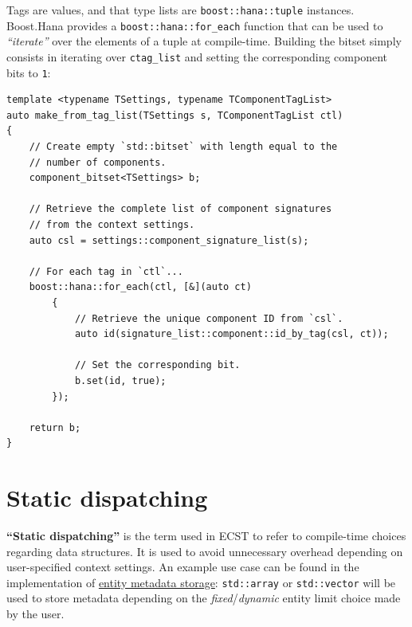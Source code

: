 \documentclass[oneside, 12pt, a4paper, openany]{book}
\begin{document}
Tags are values, and that type lists are
\texttt{boost::hana::tuple}
instances. Boost.Hana provides a
\texttt{boost::hana::for_each}
function that can be used to \emph{``iterate''} over the elements of a
tuple at compile-time. Building the bitset simply consists in iterating
over
\texttt{ctag_list}
and setting the corresponding component bits to
\texttt{1}:

\begin{verbatim}
template <typename TSettings, typename TComponentTagList>
auto make_from_tag_list(TSettings s, TComponentTagList ctl)
{
    // Create empty `std::bitset` with length equal to the
    // number of components.
    component_bitset<TSettings> b;

    // Retrieve the complete list of component signatures
    // from the context settings.
    auto csl = settings::component_signature_list(s);

    // For each tag in `ctl`...
    boost::hana::for_each(ctl, [&](auto ct)
        {
            // Retrieve the unique component ID from `csl`.
            auto id(signature_list::component::id_by_tag(csl, ct));

            // Set the corresponding bit.
            b.set(id, true);
        });

    return b;
}
\end{verbatim}

\hypertarget{appendix_static_dispatching}{\section{Static
dispatching}\label{appendix_static_dispatching}}

\textbf{``Static dispatching''} is the term used in ECST to refer to
compile-time choices regarding data structures. It is used to avoid
unnecessary overhead depending on user-specified context settings. An
example use case can be found in the implementation of
\protect\hyperlink{storage_entity}{entity metadata storage}:
\texttt{std::array}
or
\texttt{std::vector}
will be used to store metadata depending on the
\emph{fixed}/\emph{dynamic} entity limit choice made by the user.
\end{document}
